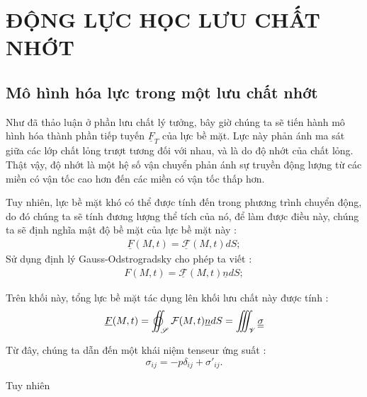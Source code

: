 \documentclass[THUY_DONG_HOC.tex]{subfiles}
\begin{document}
\chapter{ĐỘNG LỰC HỌC LƯU CHẤT NHỚT}

\newpage

\section{Mô hình hóa lực trong một lưu chất nhớt}

Như đã thảo luận ở phần lưu chất lý tưởng, bây giờ chúng ta sẽ tiến hành mô hình hóa thành phần tiếp tuyến $\underline{F}_T$ của lực bề mặt. Lực này phản ánh ma sát giữa các lớp chất lỏng trượt tương đối với nhau, và là do độ nhớt của chất lỏng. Thật vậy, độ nhớt là một hệ số vận chuyển phản ánh sự truyền động lượng từ các miền có vận tốc cao hơn đến các miền có vận tốc thấp hơn.

Tuy nhiên, lực bề mặt khó có thể được tính đến trong phương trình chuyển động, do đó chúng ta sẽ tính đương lượng thể tích của nó, để làm được điều này, chúng ta sẽ định nghĩa mật độ bề mặt của lực bề mặt này :
\begin{equation}
	\begin{aligned}
		\underline{F}(M,t)=\underline{\mathcal{F}}(M,t)dS;
	\end{aligned}
\end{equation}
Sử dụng định lý Gauss-Odstrogradsky cho phép ta viết :
\begin{equation}
	\begin{aligned}
		F(M,t)=\underline{\mathcal{F}}(M,t)\underline{n}dS;
	\end{aligned}
\end{equation}


Trên khối này, tổng lực bề mặt tác dụng lên khối lưu chất này được tính :
\begin{equation}
	\begin{aligned}
		\underline{F}(M,t)=\varoiint_\mathscr{S} \mathcal{F}(M,t)\underline{n}dS=\iiint_\mathscr{V} \underline{}\underline{\underline{\sigma}}
	\end{aligned}
\end{equation}

Từ đây, chúng ta dẫn đến một khái niệm tenseur ứng suất :
$$
\sigma_{ij}=-p\delta_{ij}+\sigma'_{ij}.
$$

Tuy nhiên
\end{document}
